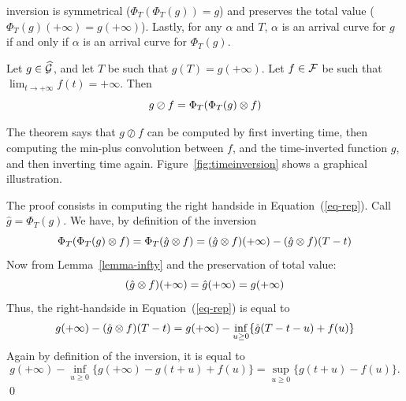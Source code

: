 inversion is symmetrical ($\Phi_{T}(\Phi_{T}(g)) = g$) and
preserves the total value ($\Phi_{T}(g)(+\infty)=g(+\infty)$).
Lastly, for any $\alpha$ and $T$, $\alpha$
is an arrival curve for $g$ if and only if $\alpha$ is an arrival curve for
$\Phi_{T}(g)$.
\begin{theorem}
    Let $g \in \widehat{\mathcal G}$, and let $T$
    be  such  that $g(T)=g(+\infty)$.  Let $f \in \mathcal F$ be such that $\lim_{t
    \rightarrow + \infty}f(t) = +\infty$.
    Then
    \begin{equation}
        g \oslash f = \Phi_{T}(\Phi_{T}(g) \otimes f)
        \mylabel{eq-rep}
    \end{equation}
\end{theorem}
The theorem says that $g \oslash f$ can be computed by first
inverting time, then computing the min-plus convolution between $f$, and
the time-inverted function $g$, and then
inverting time again. Figure~\ref{fig:timeinversion} shows a graphical
illustration.
\begin{figure}[!htbp]
\end{figure}

\pr
The proof consists in computing the right handside in
Equation~(\ref{eq-rep}). Call $\hat{g}=\Phi_{T}(g)$. We have,
by definition of the inversion
$$\Phi_{T}(\Phi_{T}(g) \otimes f)
=
\Phi_{T}(\hat{g} \otimes f)
=
(\hat{g} \otimes f)(+\infty) - (\hat{g} \otimes f)(T-t)
$$
Now from Lemma~\ref{lemma-infty} and the preservation of total
value:
$$
(\hat{g} \otimes f)(+\infty) = \hat{g}(+\infty) = g(+\infty)
$$
Thus, the right-handside in Equation~(\ref{eq-rep}) is equal to
$$
g(+\infty)- (\hat{g} \otimes f)(T-t)
=
g(+\infty)- \inf_{u \geq 0} \{\hat{g}(T-t-u) + f(u) \}
$$
Again by definition of the inversion, it is equal to
$$
g(+\infty)- \inf_{u \geq 0} \{ g(+\infty) - g(t+u) + f(u) \}
=
\sup_{u \geq 0}\{ g(t+u) - f(u) \}.
$$
\qed
